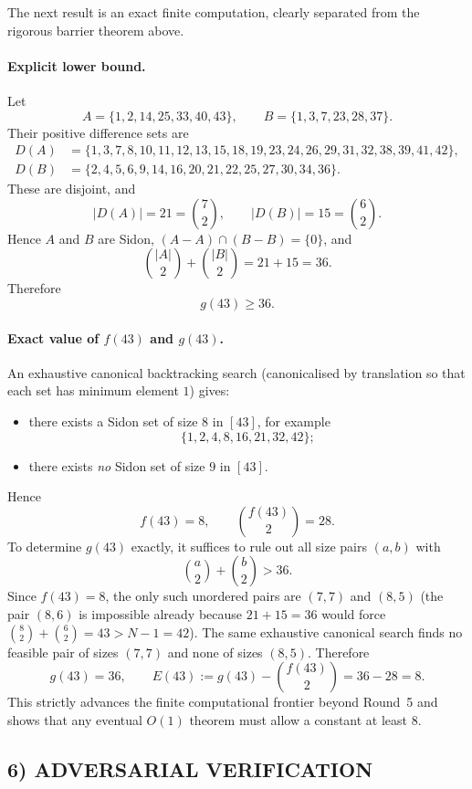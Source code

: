 The next result is an exact finite computation, clearly separated from the rigorous barrier theorem above.

\paragraph{Explicit lower bound.}
Let
\[
A=\{1,2,14,25,33,40,43\},\qquad B=\{1,3,7,23,28,37\}.
\]
Their positive difference sets are
\begin{align*}
D(A)&=\{1,3,7,8,10,11,12,13,15,18,19,23,24,26,29,31,32,38,39,41,42\},\\
D(B)&=\{2,4,5,6,9,14,16,20,21,22,25,27,30,34,36\}.
\end{align*}
These are disjoint, and
\[
|D(A)|=21=\binom72,
\qquad
|D(B)|=15=\binom62.
\]
Hence $A$ and $B$ are Sidon, $(A-A)\cap(B-B)=\{0\}$, and
\[
\binom{|A|}{2}+\binom{|B|}{2}=21+15=36.
\]
Therefore
\[
g(43)\ge 36.
\]

\paragraph{Exact value of \texorpdfstring{$f(43)$}{f(43)} and \texorpdfstring{$g(43)$}{g(43)}.}
An exhaustive canonical backtracking search (canonicalised by translation so that each set has minimum element $1$) gives:
\begin{itemize}
\item there exists a Sidon set of size $8$ in $[43]$, for example
\[
\{1,2,4,8,16,21,32,42\};
\]
\item there exists \emph{no} Sidon set of size $9$ in $[43]$.
\end{itemize}
Hence
\[
f(43)=8,
\qquad
\binom{f(43)}2=28.
\]
To determine $g(43)$ exactly, it suffices to rule out all size pairs $(a,b)$ with
\[
\binom{a}{2}+\binom{b}{2}>36.
\]
Since $f(43)=8$, the only such unordered pairs are $(7,7)$ and $(8,5)$ (the pair $(8,6)$ is impossible already because $21+15=36$ would force $\binom82+\binom62=43>N-1=42$).  The same exhaustive canonical search finds no feasible pair of sizes $(7,7)$ and none of sizes $(8,5)$.  Therefore
\[
g(43)=36,
\qquad
E(43):=g(43)-\binom{f(43)}2=36-28=8.
\]
This strictly advances the finite computational frontier beyond Round~5 and shows that any eventual $O(1)$ theorem must allow a constant at least $8$.

\subsection{6) ADVERSARIAL VERIFICATION}

